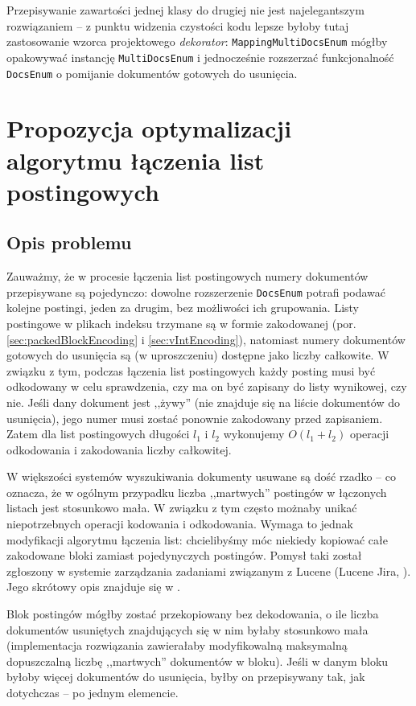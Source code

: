 Przepisywanie zawartości jednej klasy do drugiej nie jest najelegantszym rozwiązaniem -- z punktu widzenia czystości kodu lepsze byłoby tutaj zastosowanie wzorca projektowego \emph{dekorator}: \texttt{MappingMultiDocsEnum} mógłby opakowywać instancję \texttt{MultiDocsEnum} i jednocześnie rozszerzać funkcjonalność \texttt{DocsEnum} o pomijanie dokumentów gotowych do usunięcia.

\section{Propozycja optymalizacji algorytmu łączenia list postingowych}

\subsection{Opis problemu}

Zauważmy, że w procesie łączenia list postingowych numery dokumentów przepisywane są pojedynczo: dowolne rozszerzenie \texttt{DocsEnum} potrafi podawać kolejne postingi, jeden za drugim, bez możliwości ich grupowania. Listy postingowe w plikach indeksu trzymane są w formie zakodowanej (por. \ref{sec:packedBlockEncoding} i \ref{sec:vIntEncoding}), natomiast numery dokumentów gotowych do usunięcia są (w uproszczeniu) dostępne jako liczby całkowite. W związku z tym, podczas łączenia list postingowych każdy posting musi być odkodowany w celu sprawdzenia, czy ma on być zapisany do listy wynikowej, czy nie. Jeśli dany dokument jest ,,żywy'' (nie znajduje się na liście dokumentów do usunięcia), jego numer musi zostać ponownie zakodowany przed zapisaniem. Zatem dla list postingowych długości $l_1$ i $l_2$ wykonujemy $O(l_1 + l_2)$ operacji odkodowania i zakodowania liczby całkowitej.

W większości systemów wyszukiwania dokumenty usuwane są dość rzadko -- co oznacza, że w ogólnym przypadku liczba ,,martwych'' postingów w łączonych listach jest stosunkowo mała. W związku z tym często możnaby unikać niepotrzebnych operacji kodowania i odkodowania. Wymaga to jednak modyfikacji algorytmu łączenia list: chcielibyśmy móc niekiedy kopiować całe zakodowane bloki zamiast pojedynyczych postingów. Pomysł taki został zgłoszony w systemie zarządzania zadaniami związanym z Lucene (Lucene Jira, \cite{jira}). Jego skrótowy opis znajduje się w \cite{idea}.

Blok postingów mógłby zostać przekopiowany bez dekodowania, o ile liczba dokumentów usuniętych znajdujących się w nim byłaby stosunkowo mała (implementacja rozwiązania zawierałaby modyfikowalną maksymalną dopuszczalną liczbę ,,martwych'' dokumentów w bloku). Jeśli w danym bloku byłoby więcej dokumentów do usunięcia, byłby on przepisywany tak, jak dotychczas -- po jednym elemencie.

